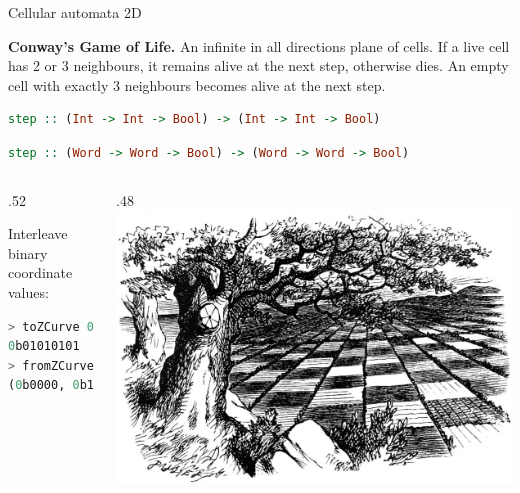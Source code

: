 \documentclass[handout]{beamer}
\begin{document}
\begin{frame}[fragile]{Cellular automata 2D}

{\bf Conway's Game of Life.}
An infinite in all directions plane of cells.
If a live cell has 2 or 3 neighbours, it remains alive at the next step,
otherwise dies. An empty cell with exactly 3 neighbours becomes alive at the next step.

\begin{lstlisting}[language=Haskell]
step :: (Int -> Int -> Bool) -> (Int -> Int -> Bool)
\end{lstlisting}

\begin{lstlisting}[language=Haskell]
step :: (Word -> Word -> Bool) -> (Word -> Word -> Bool)
\end{lstlisting}

\begin{columns}[T]
  \begin{column}{.52\textwidth}

Interleave binary coordinate values:

\begin{lstlisting}[language=Haskell]
> toZCurve 0b0000 0b1111
0b01010101
> fromZCurve 0b010101010
(0b0000, 0b1111)
\end{lstlisting}

\end{column}

\begin{column}{.48\textwidth}
  \includegraphics[width=1.11\textwidth]{chess.png}
\end{column}

\end{columns}

\end{frame}
\end{document}
